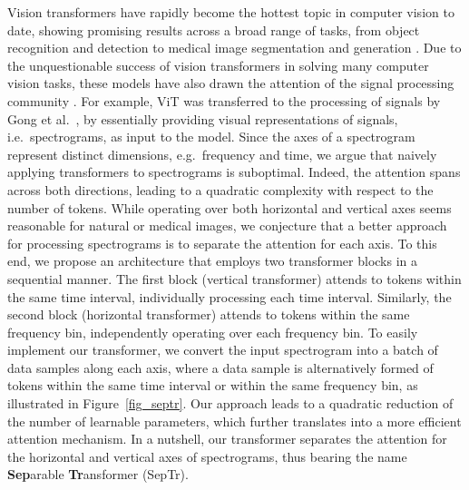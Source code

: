 \documentclass[a4paper]{article}
\begin{document}
Vision transformers \cite{Carion-ECCV-2020,Chen-arXiv-2021,Dosovitskiy-ICLR-2020,Gao-MICCAI-2021,Khan-ACS-2021,Parmar-ICML-2018,Ristea-ArXiv-2021,Touvron-ICML-2021,Wu-ICCV-2021,Zheng-BMVC-2021,Zhu-ICLR-2020} have rapidly become the hottest topic in computer vision to date, showing promising results across a broad range of tasks, from object recognition \cite{Dosovitskiy-ICLR-2020,Touvron-ICML-2021,Wu-ICCV-2021} and detection \cite{Carion-ECCV-2020,Zheng-BMVC-2021,Zhu-ICLR-2020} to medical image segmentation \cite{Chen-arXiv-2021,Gao-MICCAI-2021,Hatamizadeh-WACV-2022} and generation \cite{Ristea-ArXiv-2021}. Due to the unquestionable success of vision transformers in solving many computer vision tasks, these models have also drawn the attention of the signal processing community \cite{Gong-INTERSPEECH-2021,Illium-INTERSPEECH-2021}. For example, ViT \cite{Dosovitskiy-ICLR-2020} was transferred to the processing of signals by Gong et al.~\cite{Gong-INTERSPEECH-2021}, by essentially providing visual representations of signals, i.e.~spectrograms, as input to the model. Since the axes of a spectrogram represent distinct dimensions, e.g.~frequency and time, we argue that naively applying transformers to spectrograms is suboptimal. Indeed, the attention spans across both directions, leading to a quadratic complexity with respect to the number of tokens. While operating over both horizontal and vertical axes seems reasonable for natural or medical images, we conjecture that a better approach for processing spectrograms is to separate the attention for each axis. To this end, we propose an architecture that employs two transformer blocks in a sequential manner. The first block (vertical transformer) attends to tokens within the same time interval, individually processing each time interval. Similarly, the second block (horizontal transformer) attends to tokens within the same frequency bin, independently operating over each frequency bin. To easily implement our transformer, we convert the input spectrogram into a batch of data samples along each axis, where a data sample is alternatively formed of tokens within the same time interval or within the same frequency bin, as illustrated in Figure~\ref{fig_septr}. Our approach leads to a quadratic reduction of the number of learnable parameters, which further translates into a more efficient attention mechanism. In a nutshell, our transformer separates the attention for the horizontal and vertical axes of spectrograms, thus bearing the name \textbf{Sep}arable \textbf{Tr}ansformer (SepTr).
\end{document}
